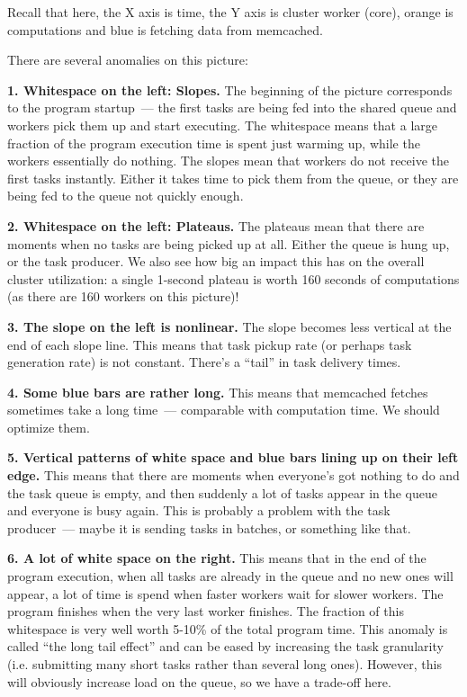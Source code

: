 \documentclass{article}
\begin{document}
Recall that here, the X axis is time, the Y axis is cluster worker (core), orange is computations and blue is fetching data from memcached.

There are several anomalies on this picture:

\vspace{3mm}

\textbf{1. Whitespace on the left: Slopes.} The beginning of the picture corresponds to the program startup~--- the first tasks are being fed into the shared queue and workers pick them up and start executing. The whitespace means that a large fraction of the program execution time is spent just warming up, while the workers essentially do nothing. The slopes mean that workers do not receive the first tasks instantly. Either it takes time to pick them from the queue, or they are being fed to the queue not quickly enough.

\textbf{2. Whitespace on the left: Plateaus.} The plateaus mean that there are moments when no tasks are being picked up at all. Either the queue is hung up, or the task producer. We also see how big an impact this has on the overall cluster utilization: a single 1-second plateau is worth 160 seconds of computations (as there are 160 workers on this picture)!

\textbf{3. The slope on the left is nonlinear.} The slope becomes less vertical at the end of each slope line. This means that task pickup rate (or perhaps task generation rate) is not constant. There's a ``tail'' in task delivery times. 

\textbf{4. Some blue bars are rather long.} This means that memcached fetches sometimes take a long time~--- comparable with computation time. We should optimize them.

\textbf{5. Vertical patterns of white space and blue bars lining up on their left edge.} This means that there are moments when everyone's got nothing to do and the task queue is empty, and then suddenly a lot of tasks appear in the queue and everyone is busy again. This is probably a problem with the task producer~--- maybe it is sending tasks in batches, or something like that.

\textbf{6. A lot of white space on the right.} This means that in the end of the program execution, when all tasks are already in the queue and no new ones will appear, a lot of time is spend when faster workers wait for slower workers. The program finishes when the very last worker finishes. The fraction of this whitespace is very well worth 5-10\% of the total program time. This anomaly is called ``the long tail effect'' and can be eased by increasing the task granularity (i.e. submitting many short tasks rather than several long ones). However, this will obviously increase load on the queue, so we have a trade-off here.
\end{document}
